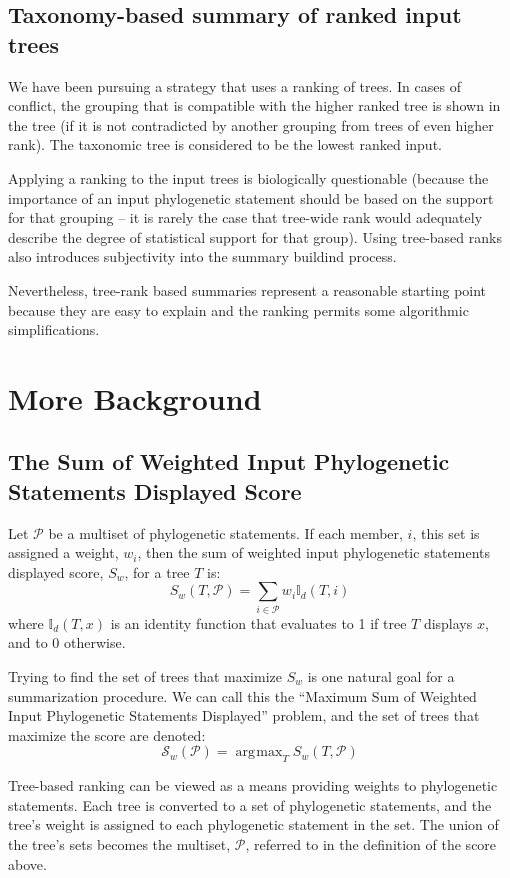 \documentclass[11pt]{article}
\newcommand{\ps}{phylogenetic statement\xspace}
\newcommand{\pss}{phylogenetic statements\xspace}
\newcommand{\PSs}{Phylogenetic Statements\xspace}
\newcommand{\SWIPSD}{Sum of Weighted Input \PSs Displayed\xspace}
\newcommand{\MSWIPSD}{Maximum \SWIPSD \xspace}
\newcommand{\displaysPred}[2]{\ensuremath{\mathbb{I}_d(#1, #2)}}
\DeclareMathOperator*{\argmax}{\arg\!\max}
\begin{document}
\subsection{Taxonomy-based summary of ranked input trees}
We have been pursuing a strategy that uses a ranking of trees.
In cases of conflict, the grouping that is compatible with the 
    higher ranked tree is shown in the tree (if it is not contradicted by 
    another grouping from trees of even higher rank).
 The taxonomic tree is considered to be the lowest ranked input.

Applying a ranking to the input trees is biologically questionable (because
    the importance of an input \ps should be based on the support for that
    grouping -- it is rarely the case that tree-wide rank would adequately
    describe the degree of statistical support for that group).
Using tree-based ranks also introduces subjectivity into the summary buildind process.

Nevertheless, tree-rank based summaries represent a reasonable starting point
    because they are easy to explain and the ranking permits some algorithmic
    simplifications.

\section{More Background}
\subsection{The Sum of Weighted Input \PSs Displayed Score}
Let $\mathcal{P}$ be a multiset of \pss.
If each member, $i$, this set is assigned a weight, $w_i$, then the 
sum of weighted input \pss displayed score, $S_w$, for a tree $T$ is:
\begin{equation}
    S_w(T, \mathcal{P}) = \sum_{i\in \mathcal{P}} w_i \displaysPred{T}{i}
\end{equation}
where {\displaysPred{T}{x}} is an identity function that evaluates to 1 if tree $T$
        displays $x$, and to 0 otherwise.

Trying to find the set of trees that maximize $S_w$ is one natural
    goal for a summarization procedure.
We can call this the ``\MSWIPSD''
problem,
    and the set of trees that maximize the score are denoted:
\begin{equation}
    \mathcal{S}_{w}(\mathcal{P}) = \argmax_T S_w(T,\mathcal{P}) 
\end{equation}

Tree-based ranking can be viewed as a means providing weights to \pss.
Each tree is converted to a set of \pss, and the tree's weight is 
    assigned to each \ps in the set.
The union of the tree's sets becomes the multiset, $\mathcal{P}$, referred to
    in the definition of the score above.
\end{document}
